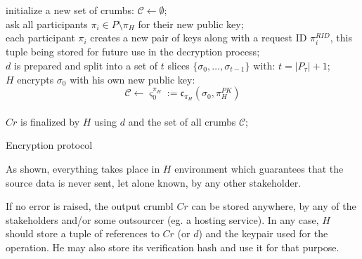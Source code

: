 \documentclass[twoside,twocolumn]{article}
\theoremstyle{definition}
\theoremstyle{remark}
\begin{document}
\begin{algorithm}
    initialize a new set of crumbs: $\mathcal{C} \gets \emptyset$; \\
    ask all participants $\pi_i \in P \setminus {\pi_H}$ for their new public key; \\
    each participant $\pi_i$ creates a new pair of keys along with a request ID $\pi_i^{RID}$, this tuple being stored for future use in the decryption 
        process; \\
    $d$ is prepared and split into a set of $t$ slices $\{ \sigma_0, \dots, \sigma_{t-1} \}$ with: $t = |P_\tau| + 1$; \\
    $H$ encrypts $\sigma_0$ with his own new public key:
    \begin{equation}
        \label{eq:crumb0}
        \mathcal{C} \gets \varsigma_0^{\pi_H} := \mathfrak{c}_{\pi_H}(\sigma_0, \pi_H^{PK})
    \end{equation} \\
    $Cr$ is finalized by $H$ using $d$ and the set of all crumbs $\mathcal{C}$; \\
    \caption{Encryption protocol}
    \label{algo:encryption}
\end{algorithm}

As shown, everything takes place in $H$ environment which guarantees that the source data is never sent, let alone known, by any other stakeholder.

If no error is raised, the output crumbl $Cr$ can be stored anywhere, by any of the stakeholders and/or some outsourcer (eg. a hosting service). In any 
case, $H$ should store a tuple of references to $Cr$ (or $d$) and the keypair used for the operation. He may also store its verification hash and use 
it for that purpose.
\end{document}
